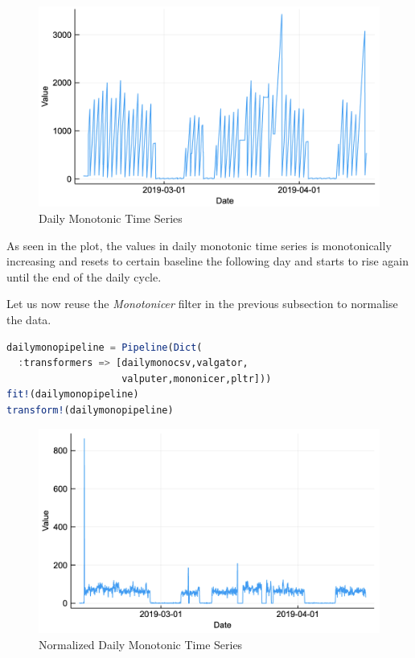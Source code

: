\documentclass{juliacon}
\begin{document}
\begin{figure}[htbp]
   \centering
   \includegraphics[width=\columnwidth]{dailymono.png} %
   \caption{Daily Monotonic Time Series}
   \label{fig:dailymono}
\end{figure}

As seen in the plot, the values in daily monotonic time series is monotonically increasing and resets to certain baseline the following day and starts to rise again until the end of the daily cycle.

\vskip 6pt

Let us now reuse the \emph{Monotonicer} filter in the previous subsection to normalise the data.

\begin{lstlisting}[language = Julia]
dailymonopipeline = Pipeline(Dict(
  :transformers => [dailymonocsv,valgator,
                    valputer,mononicer,pltr]))
fit!(dailymonopipeline)
transform!(dailymonopipeline)
\end{lstlisting}

\begin{figure}[htbp]
   \centering
   \includegraphics[width=\columnwidth]{normdailymono.png}  %
   \caption{Normalized Daily Monotonic Time Series}
   \label{fig:ndailymono}
\end{figure}
\end{document}

